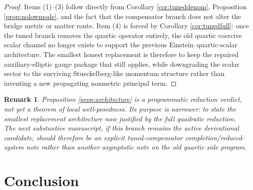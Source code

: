 \documentclass[11pt]{article}
\newtheorem{remark}{Remark}
\begin{document}
\begin{proof}
Items (1)--(3) follow directly from Corollary \ref{cor:tuneddenom}, Proposition \ref{prop:nolowmode}, and the fact that the compensator branch does not alter the bridge metric or matter route. Item (4) is forced by Corollary \ref{cor:tunedfull}: once the tuned branch removes the quartic operator entirely, the old quartic coercive scalar channel no longer exists to support the previous Einstein--quartic-scalar architecture. The smallest honest replacement is therefore to keep the repaired auxiliary-elliptic gauge package that still applies, while downgrading the scalar sector to the surviving Stueckelberg-like momentum structure rather than inventing a new propagating nonmetric principal term.
\end{proof}

\begin{remark}
Proposition \ref{prop:architecture} is a programmatic reduction verdict, not yet a theorem of local well-posedness. Its purpose is narrower: to state the smallest replacement architecture now justified by the full quadratic reduction. The next substantive manuscript, if this branch remains the active derivational candidate, should therefore be an explicit tuned-compensator completion/reduced-system note rather than another asymptotic note on the old quartic side program.
\end{remark}

\section{Conclusion}
\end{document}
